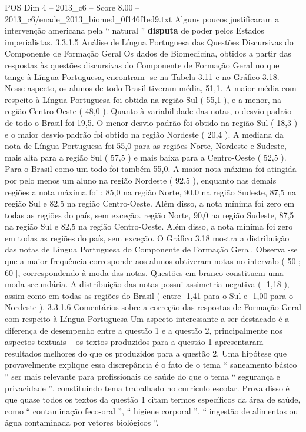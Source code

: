 \begin{textsample}{POS Dim 4 – 2013\_c6 – Score 8.00 – 2013\_c6/enade\_2013\_biomed\_0f146f1ed9.txt}
Alguns poucos justificaram a intervenção americana pela “ natural ” \textbf{disputa} de poder pelos Estados imperialistas. 3.3.1.5 Análise de Língua Portuguesa das Questões Discursivas do Componente de Formação Geral Os dados de Biomedicina, obtidos a partir das respostas às questões discursivas do Componente de Formação Geral no que tange à Língua Portuguesa, encontram -se na Tabela 3.11 e no Gráfico 3.18.
Nesse aspecto, os alunos de todo Brasil tiveram média, 51,1.
A maior média com respeito à Língua Portuguesa foi obtida na região Sul ( 55,1 ), e a menor, na região Centro-Oeste ( 48,0 ).
Quanto à variabilidade das notas, o desvio padrão de todo o Brasil foi 19,5.
O menor desvio padrão foi obtido na região Sul ( 18,3 ) e o maior desvio padrão foi obtido na região Nordeste ( 20,4 ).
A mediana da nota de Língua Portuguesa foi 55,0 para as regiões Norte, Nordeste e Sudeste, mais alta para a região Sul ( 57,5 ) e mais baixa para a Centro-Oeste ( 52,5 ).
Para o Brasil como um todo foi também 55,0.
A maior nota máxima foi atingida por pelo menos um aluno na região Nordeste ( 92,5 ), enquanto nas demais regiões a nota máxima foi : 85,0 na região Norte, 90,0 na região Sudeste, 87,5 na região Sul e 82,5 na região Centro-Oeste.
Além disso, a nota mínima foi zero em todas as regiões do país, sem exceção. região Norte, 90,0 na região Sudeste, 87,5 na região Sul e 82,5 na região Centro-Oeste.
Além disso, a nota mínima foi zero em todas as regiões do país, sem exceção.
O Gráfico 3.18 mostra a distribuição das notas de Língua Portuguesa do Componente de Formação Geral.
Observa -se que a maior frequência corresponde aos alunos obtiveram notas no intervalo ( 50 ; 60 ], correspondendo à moda das notas.
Questões em branco constituem uma moda secundária.
A distribuição das notas possui assimetria negativa ( -1,18 ), assim como em todas as regiões do Brasil ( entre -1,41 para o Sul e -1,00 para o Nordeste ). 3.3.1.6 Comentários sobre a correção das respostas de Formação Geral com respeito à Língua Portuguesa Um aspecto interessante a ser destacado é a diferença de desempenho entre a questão 1 e a questão 2, principalmente nos aspectos textuais – os textos produzidos para a questão 1 apresentaram resultados melhores do que os produzidos para a questão 2.
Uma hipótese que provavelmente explique essa discrepância é o fato de o tema “ saneamento básico ” ser mais relevante para profissionais de saúde do que o tema “ segurança e privacidade ”, constituindo tema trabalhado no currículo escolar.
Prova disso é que quase todos os textos da questão 1 citam termos específicos da área de saúde, como “ contaminação feco-oral ”, “ higiene corporal ”, “ ingestão de alimentos ou água contaminada por vetores biológicos ”.

\end{textsample}
